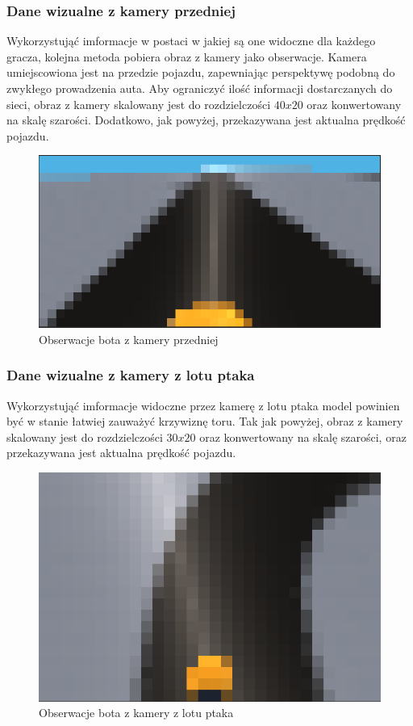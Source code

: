 \subsubsection{Dane wizualne z kamery przedniej}
Wykorzystująć imformacje w postaci w jakiej są one widoczne dla każdego gracza, kolejna metoda pobiera obraz z kamery jako obserwacje. Kamera umiejscowiona jest na przedzie pojazdu, zapewniając perspektywę podobną do zwykłego prowadzenia auta. Aby ograniczyć ilość informacji dostarczanych do sieci, obraz z kamery skalowany jest do rozdzielczości $40x20$ oraz konwertowany na skalę szarości. Dodatkowo, jak powyżej, przekazywana jest aktualna prędkość pojazdu.
\begin{figure}[H]
    \centering
    \includegraphics[width=.5\textwidth]{figures/observations_2}
    \caption{Obserwacje bota z kamery przedniej}
    \label{fig}
\end{figure}

\subsubsection{Dane wizualne z kamery z lotu ptaka}
Wykorzystująć imformacje widoczne przez kamerę z lotu ptaka model powinien być w stanie łatwiej zauważyć krzywiznę toru. Tak jak powyżej, obraz z kamery skalowany jest do rozdzielczości $30x20$ oraz konwertowany na skalę szarości, oraz przekazywana jest aktualna prędkość pojazdu.
\begin{figure}[H]
    \centering
    \includegraphics[width=.5\textwidth]{figures/observations_3}
    \caption{Obserwacje bota z kamery z lotu ptaka}
    \label{fig}
\end{figure}

